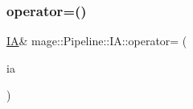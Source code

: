 \hypertarget{structmage_1_1_pipeline_1_1_i_a_a868276d459b834b11947ff4d79415ccb}{}\label{structmage_1_1_pipeline_1_1_i_a_a868276d459b834b11947ff4d79415ccb} 
\subsubsection{\texorpdfstring{operator=()}{operator=()}\hspace{0.1cm}{\footnotesize\ttfamily [2/2]}}
{\footnotesize\ttfamily \hyperlink{structmage_1_1_pipeline_1_1_i_a}{IA}\& mage\+::\+Pipeline\+::\+I\+A\+::operator= (\begin{DoxyParamCaption}\item[{\hyperlink{structmage_1_1_pipeline_1_1_i_a}{IA} \&\&}]{ia }\end{DoxyParamCaption})\hspace{0.3cm}{\ttfamily [delete]}}

